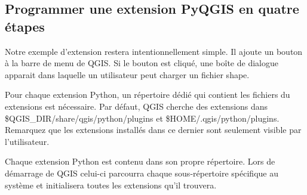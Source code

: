 \subsection{Programmer une extension PyQGIS en quatre \'etapes}\label{subsec:pyfoursteps}

Notre exemple d'extension restera intentionnellement simple. Il ajoute un bouton \`a
la barre de menu de QGIS. Si le bouton est cliqu\'e, une bo\^ite de dialogue
apparait dans laquelle un utilisateur peut charger un fichier shape.

Pour chaque extension Python, un r\'epertoire d\'edi\'e qui contient les fichiers du
extensions est n\'ecessaire. Par d\'efaut, QGIS cherche des extensions dans
\$QGIS\_DIR/share/qgis/python/plugins et \$HOME/.qgis/python/plugins.
Remarquez que les extensions install\'es dans ce dernier  sont seulement visible
par l'utilisateur.


Chaque extension Python est contenu dans son propre r\'epertoire. Lors de d\'emarrage
de QGIS celui-ci parcourra chaque sous-r\'epertoire sp\'ecifique au syst\`eme et
initialisera toutes les extensions qu'il trouvera.

